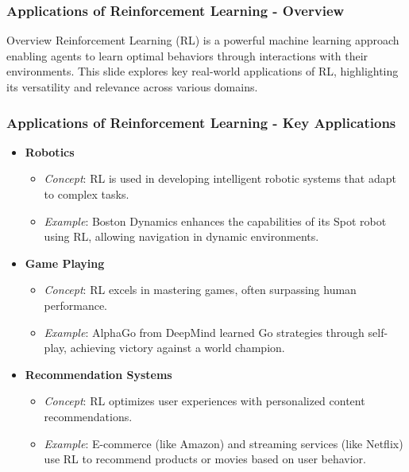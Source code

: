 \documentclass[aspectratio=169]{beamer}
\begin{document}
\begin{frame}[fragile]
    \frametitle{Applications of Reinforcement Learning - Overview}
    \begin{block}{Overview}
        Reinforcement Learning (RL) is a powerful machine learning approach enabling agents to learn optimal behaviors through interactions with their environments.
        This slide explores key real-world applications of RL, highlighting its versatility and relevance across various domains.
    \end{block}
\end{frame}

\begin{frame}[fragile]
    \frametitle{Applications of Reinforcement Learning - Key Applications}
    \begin{itemize}
        \item \textbf{Robotics}
        \begin{itemize}
            \item \textit{Concept}: RL is used in developing intelligent robotic systems that adapt to complex tasks.
            \item \textit{Example}: Boston Dynamics enhances the capabilities of its Spot robot using RL, allowing navigation in dynamic environments.
        \end{itemize}
        
        \item \textbf{Game Playing}
        \begin{itemize}
            \item \textit{Concept}: RL excels in mastering games, often surpassing human performance.
            \item \textit{Example}: AlphaGo from DeepMind learned Go strategies through self-play, achieving victory against a world champion.
        \end{itemize}
        
        \item \textbf{Recommendation Systems}
        \begin{itemize}
            \item \textit{Concept}: RL optimizes user experiences with personalized content recommendations.
            \item \textit{Example}: E-commerce (like Amazon) and streaming services (like Netflix) use RL to recommend products or movies based on user behavior.
        \end{itemize}
    \end{itemize}
\end{frame}
\end{document}
